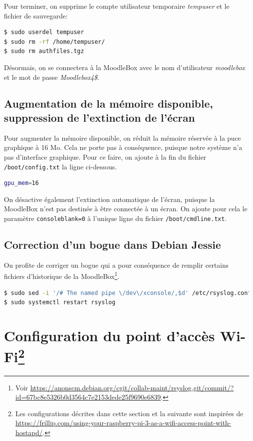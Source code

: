 \documentclass[11pt]{article}
\begin{document}
Pour terminer, on supprime le compte utilisateur temporaire \emph{tempuser} et le fichier de sauvegarde:
\begin{lstlisting}[language=bash]
$ sudo userdel tempuser
$ sudo rm -rf /home/tempuser/
$ sudo rm authfiles.tgz
\end{lstlisting}

Désormais, on se connectera à la MoodleBox avec le nom d'utilisateur \emph{moodlebox} et le mot de passe \emph{Moodlebox4\$}.

\subsection{Augmentation de la mémoire disponible, suppression de l'extinction de l'écran}

Pour augmenter la mémoire disponible, on réduit la mémoire réservée à la puce graphique à 16 Mo. Cela ne porte pas à conséquence, puisque notre système n'a pas d'interface graphique. Pour ce faire, on ajoute à la fin du fichier \lstinline{/boot/config.txt} la ligne ci-dessous.
\begin{lstlisting}[language=bash]
gpu_mem=16
\end{lstlisting}

On désactive également l'extinction automatique de l'écran, puisque la MoodleBox n'est pas destinée à être connectée à un écran. On ajoute pour cela le paramètre \lstinline{consoleblank=0} à l'unique ligne du fichier \lstinline{/boot/cmdline.txt}.

\subsection{Correction d'un bogue dans Debian Jessie}

On profite de corriger un bogue qui a pour conséquence de remplir certains fichiers d'historique de la MoodleBox\footnote{Voir \url{https://anonscm.debian.org/cgit/collab-maint/rsyslog.git/commit/?id=67bc8e5326b0d3564c7e2153dede25f9690e6839}.}.

\begin{lstlisting}[language=bash]
$ sudo sed -i '/# The named pipe \/dev\/xconsole/,$d' /etc/rsyslog.conf
$ sudo systemctl restart rsyslog
\end{lstlisting}

\section[Configuration du point d'accès Wi-Fi]{Configuration du point d'accès Wi-Fi\footnote{Les configurations décrites dans cette section et la suivante sont inspirées de \url{https://frillip.com/using-your-raspberry-pi-3-as-a-wifi-access-point-with-hostapd/}.}}
\end{document}
